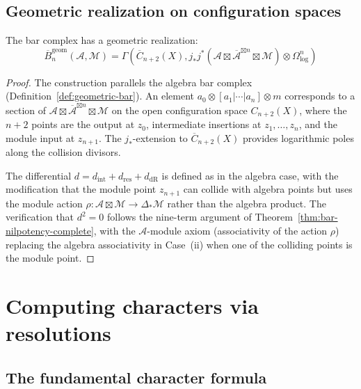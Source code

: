 \subsection{Geometric realization on configuration spaces}

\begin{theorem}
\label{thm:geometric-bar-module}
The bar complex has a geometric realization:
\[
\overline{B}_n^{\text{geom}}(\mathcal{A}, \mathcal{M}) = \Gamma(\overline{C}_{n+2}(X), j_*j^*(\mathcal{A} \boxtimes \overline{\mathcal{A}}^{\boxtimes n} \boxtimes \mathcal{M}) \otimes \Omega^n_{\log})
\]
\end{theorem}

\begin{proof}
The construction parallels the algebra bar complex (Definition~\ref{def:geometric-bar}). An element $a_0 \otimes [a_1|\cdots|a_n] \otimes m$ corresponds to a section of $\mathcal{A} \boxtimes \overline{\mathcal{A}}^{\boxtimes n} \boxtimes \mathcal{M}$ on the open configuration space $C_{n+2}(X)$, where the $n+2$ points are the output at $z_0$, intermediate insertions at $z_1, \ldots, z_n$, and the module input at $z_{n+1}$. The $j_*$-extension to $\overline{C}_{n+2}(X)$ provides logarithmic poles along the collision divisors.

The differential $d = d_{\mathrm{int}} + d_{\mathrm{res}} + d_{\mathrm{dR}}$ is defined as in the algebra case, with the modification that the module point $z_{n+1}$ can collide with algebra points but uses the module action $\rho\colon \mathcal{A} \boxtimes \mathcal{M} \to \Delta_*\mathcal{M}$ rather than the algebra product. The verification that $d^2 = 0$ follows the nine-term argument of Theorem~\ref{thm:bar-nilpotency-complete}, with the $\mathcal{A}$-module axiom (associativity of the action $\rho$) replacing the algebra associativity in Case~(ii) when one of the colliding points is the module point.
\end{proof}

\section{Computing characters via resolutions}\label{sec:computing-characters}

\subsection{The fundamental character formula}

